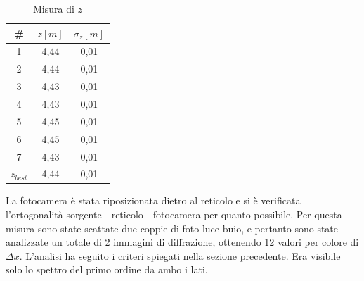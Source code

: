 \documentclass{article}
\begin{document}
\begin{table}[h]
    \centering
        \begin{tabular}{||c|c|c||}
            \hline
            \# & $z [m]$ & $\sigma_z [m]$\\
            \hline
            1 & 4,44 & 0,01 \\
            2 & 4,44 & 0,01 \\
            3 & 4,43 & 0,01 \\
            4 & 4,43 & 0,01 \\
            5 & 4,45 & 0,01 \\
            6 & 4,45 & 0,01 \\
            7 & 4,43 & 0,01 \\
            \hline
            $z_{best}$ & 4,44 & 0,01 \\
            \hline
        \end{tabular}
    \caption{Misura di $z$}
\end{table}

La fotocamera è stata riposizionata dietro al reticolo e si è verificata l'ortogonalità sorgente - reticolo - fotocamera per quanto possibile. Per questa misura sono state scattate due coppie di foto luce-buio, e pertanto sono state analizzate un totale di 2 immagini di diffrazione, ottenendo 12 valori per colore di $\Delta x$. L'analisi ha seguito i criteri spiegati nella sezione precedente. Era visibile solo lo spettro del primo ordine da ambo i lati.
\end{document}

